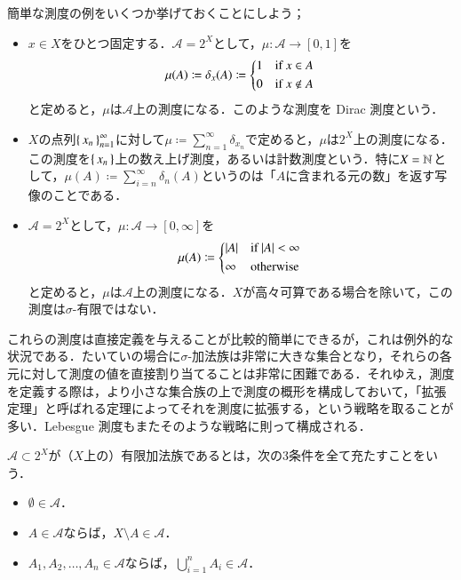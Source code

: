 \begin{exm}簡単な測度の例をいくつか挙げておくことにしよう；
\begin{itemize}
\item $x\in X$をひとつ固定する．$\mathcal{A}=2^X$として，$\mu \colon \mathcal{A} \to [0,1]$を
\begin{equation}
\mu(A) \coloneqq \delta_x(A) \coloneqq \begin{dcases*}
    1 & if $x \in A$ \\
    0 & if $x \notin A$
  \end{dcases*}
\end{equation}と定めると，$\mu$は$\mathcal{A}$上の測度になる．このような測度を Dirac 測度という．
\item $X$の点列$\set{x_n}_{n=1}^\infty$に対して$\mu \coloneqq \sum_{n=1}^\infty \delta_{x_n}$で定めると，$\mu$は$2^X$上の測度になる．この測度を$\set{x_n}$上の数え上げ測度，あるいは計数測度という．特に$X = \mathbb{N}$として，$\mu(A) \coloneqq \sum_{i=n}^\infty \delta_n (A)$というのは「$A$に含まれる元の数」を返す写像のことである．
\item $\mathcal{A}=2^X$として，$\mu \colon \mathcal{A} \to [0,\infty]$を
\begin{equation}
\mu(A) \coloneqq \begin{dcases*}
    |A| & if $|A| < \infty$ \\
    \infty & otherwise
  \end{dcases*}
\end{equation}と定めると，$\mu$は$\mathcal{A}$上の測度になる．$X$が高々可算である場合を除いて，この測度は$\sigma$-有限ではない．
\end{itemize}
\end{exm}

これらの測度は直接定義を与えることが比較的簡単にできるが，これは例外的な状況である．たいていの場合に$\sigma$-加法族は非常に大きな集合となり，それらの各元に対して測度の値を直接割り当てることは非常に困難である．それゆえ，測度を定義する際は，より小さな集合族の上で測度の概形を構成しておいて，「拡張定理」と呼ばれる定理によってそれを測度に拡張する，という戦略を取ることが多い．Lebesgue 測度もまたそのような戦略に則って構成される．

\begin{defi}
$\mathcal{A} \subset 2^X$が（$X$上の）有限加法族であるとは，次の3条件を全て充たすことをいう．

\begin{itemize}
\item $\emptyset \in \mathcal{A}$．
\item $A \in \mathcal{A}$ならば，$X \setminus A \in \mathcal{A}$．
\item $A_1, A_2, \dots, A_n \in \mathcal{A}$ならば，$\bigcup_{i=1}^n A_i \in \mathcal{A}$．
\end{itemize}
\end{defi}

